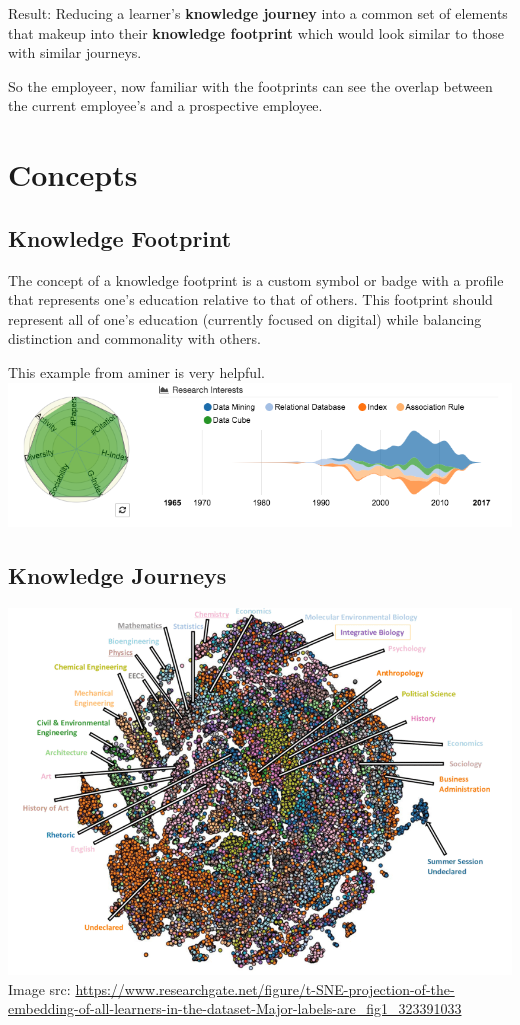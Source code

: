 \documentclass{acm_proc_article-sp}
\begin{document}
Result: Reducing a learner's \textbf{knowledge journey} into a common
set of elements that makeup into their \textbf{knowledge footprint}
which would look similar to those with similar journeys.

So the employeer, now familiar with the footprints can see the overlap
between the current employee's and a prospective employee.

\section{Concepts}\label{concepts}

\subsection{Knowledge Footprint}\label{knowledge-footprint}

The concept of a knowledge footprint is a custom symbol or badge with a
profile that represents one's education relative to that of others. This
footprint should represent all of one's education (currently focused on
digital) while balancing distinction and commonality with others.

This example from aminer is very helpful.
\includegraphics{img/aminer.png}

\subsection{Knowledge Journeys}\label{knowledge-journeys}

\includegraphics{img/tsne.png} Image src:
\url{https://www.researchgate.net/figure/t-SNE-projection-of-the-embedding-of-all-learners-in-the-dataset-Major-labels-are_fig1_323391033}
\end{document}
